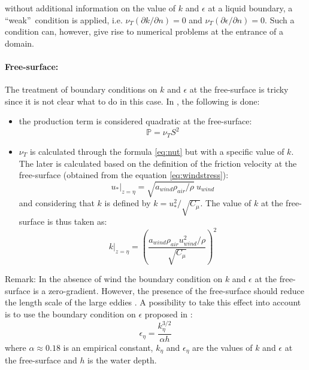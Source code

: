without additional information on the value of $k$ and $\epsilon$ at a
liquid boundary, a \textquotedblleft weak\textquotedblright\ condition is
applied, i.e. $\nu_T(\partial k/\partial n)=0$ and
$\nu_T(\partial\epsilon/\partial n)=0$. Such a condition can, however, give
rise to numerical problems at the entrance of a domain.

\paragraph{Free-surface:}
The treatment of boundary conditions on $k$ and $\epsilon$ at the free-surface
is tricky since it is not clear what to do in this case.
In , the following is done:
\begin{itemize}
\item the production term is considered quadratic at the free-surface:
\begin{equation}
\mathbb{P}=\nu_TS^2
\end{equation}
\item $\nu_T$ is calculated through the formula \eqref{eq:nut} but with a specific value of $k$.
The later is calculated based on the definition of the friction
velocity at the free-surface (obtained from the equation \eqref{eq:windstress}):
\begin{equation}
u_\ast|_{z=\eta}=\sqrt{a_{wind}\rho_{air}/\rho}~u_{wind}
\end{equation}
and considering that $k$ is defined by $k=u_\ast^2/\sqrt{C_\mu}$. The value
of $k$ at the free-surface is thus taken as:
\begin{equation}
k|_{z=\eta}=\left(\dfrac{a_{wind}\rho_{air}u_{wind}^2/\rho}{\sqrt{C_\mu}}\right)^2
\end{equation}
\end{itemize}

\begin{CommentBlock}{Remark:}
In the absence of wind the boundary condition on $k$ and $\epsilon$
at the free-surface is a zero-gradient.
However, the presence of the free-surface should reduce the length scale of the large eddies \cite{Hunt1984}.
A possibility to take this effect into account is to use the boundary condition on $\epsilon$
proposed in \cite{Celik1984}:
\begin{equation}
\epsilon_\eta=\dfrac{k_\eta^{3/2}}{\alpha h}
\end{equation}
where $\alpha \approx 0.18$ is an empirical constant, $k_\eta$ and $\epsilon_\eta$ are
the values of $k$ and $\epsilon$ at the free-surface and $h$ is the water depth.
\end{CommentBlock}

